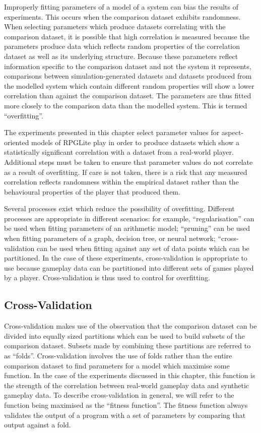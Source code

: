Improperly fitting parameters of a model of a system can bias the results of
experiments. This occurs when the comparison dataset exhibits randomness. When
selecting parameters which produce datasets correlating with the comparison
dataset, it is possible that high correlation is measured because the parameters
produce data which reflects random properties of the correlation dataset as well
as its underlying structure. Because these parameters reflect information
specific to the comparison dataset and not the system it represents, comparisons
between simulation-generated datasets and datasets produced from the modelled
system which contain different random properties will show a lower correlation
than against the comparison dataset. The parameters are thus fitted more closely
to the comparison data than the modelled system. This is termed ``overfitting''.

The experiments  presented in this chapter select parameter values for
aspect-oriented models of RPGLite play in order to produce datasets which show a
statistically significant correlation with a dataset from a real-world player.
Additional steps must be taken to ensure that parameter values do not correlate
as a result of overfitting. If care is not taken, there is a risk that any
measured correlation reflects randomness within the empirical dataset rather
than the behavioural properties of the player that produced them.

Several processes exist which reduce the possibility of overfitting. Different
processes are appropriate in different scenarios: for example,
``regularisation'' can be used when fitting parameters of an arithmetic model;
``pruning'' can be used when fitting parameters of a graph, decision tree, or
neural network; ``cross-validation can be used when fitting against any set of
data points which can be partitioned. In the case of these experiments,
cross-validation is appropriate to use because gameplay data can be partitioned
into different sets of games played by a player. Cross-validation is thus used
to control for overfitting.


\subsection{Cross-Validation}
\label{k_fold_validation_explanation}

Cross-validation makes use of the observation that the comparison dataset can be
divided into equally sized partitions which can be used to build subsets of the
comparison dataset. Subsets made by combining these partitions are referred to
as ``folds''. Cross-validation involves the use of folds rather than the entire
comparison dataset to find parameters for a model which maximise some function.
In the case of the experiments discussed in this chapter, this function is the
strength of the correlation between real-world gameplay data and synthetic
gameplay data. To describe cross-validation in general, we will refer to the
function being maximised as the ``fitness function''. The fitness function
always validates the output of a program with a set of parameters by comparing
that output against a fold.

